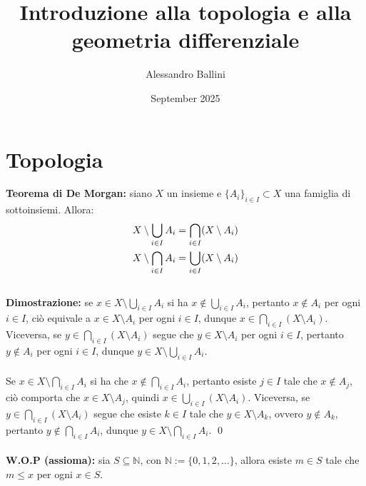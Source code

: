 \documentclass{article}
\title{Introduzione alla topologia e alla geometria differenziale}
\author{Alessandro Ballini}
\date{September 2025}
\begin{document}
\maketitle
\tableofcontents
\newpage
\section{Topologia}
\textbf{Teorema di De Morgan:} siano $X$ un insieme e $\{ A_i \}_{i \in I} \subset X$ una famiglia di sottoinsiemi. Allora:
\begin{gather}
    X \setminus \bigcup_{i \in I} A_i = \bigcap_{i \in I} (X \setminus A_i) \notag \\
    X \setminus \bigcap_{i \in I} A_i = \bigcup_{i \in I} (X \setminus A_i) \notag
\end{gather} \\

\textbf{Dimostrazione:} se $x \in X \setminus \bigcup_{i \in I} A_i$ si ha $x \not\in \bigcup_{i \in I} A_i$, pertanto $x \not\in A_i$ per ogni $i \in I$, ciò equivale a $x \in X \setminus A_i$ per ogni $i \in I$, dunque $x \in \bigcap_{i \in I} (X \setminus A_i)$. Viceversa, se $y \in \bigcap_{i \in I} (X \setminus A_i)$ segue che $y \in X \setminus A_i$ per ogni $i \in I$, pertanto $y \not\in A_i$ per ogni $i \in I$, dunque $y \in X \setminus \bigcup_{i \in I} A_i$. \\ \\
Se $x \in X \setminus \bigcap_{i \in I} A_i$ si ha che $x \not\in \bigcap_{i \in I} A_i$, pertanto esiste $j \in I$ tale che $x \not\in A_j$, ciò comporta che $x \in X \setminus A_j$, quindi $x \in \bigcup_{i \in I} (X \setminus A_i)$. Viceversa, se $y \in \bigcap_{i \in I} (X \setminus A_i)$ segue che esiste $k \in I$ tale che $y \in X \setminus A_k$, ovvero $y \not\in A_k$, pertanto $y \not\in \bigcap_{i \in I} A_i$, dunque $y \in X \setminus \bigcap_{i \in I} A_i$. \qed \\ \\
\textbf{W.O.P (assioma):} sia $S \subseteq \mathbb{N}$, con $\mathbb{N} := \{0, 1, 2, \dots\}$, allora esiste $m \in S$ tale che $m \leq x$ per ogni $x \in S$.
\end{document}

